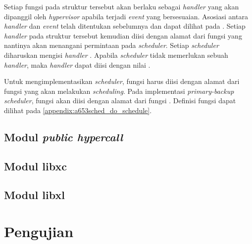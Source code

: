 Setiap fungsi pada struktur tersebut akan berlaku sebagai \textit{handler} yang akan dipanggil oleh \textit{hypervisor} apabila terjadi \textit{event} yang bersesuaian.
Asosiasi antara \textit{handler} dan \textit{event} telah ditentukan sebelumnya dan dapat dilihat pada .
Setiap \textit{handler} pada struktur tersebut kemudian diisi dengan alamat dari fungsi yang nantinya akan menangani permintaan pada \textit{scheduler}. Setiap \textit{scheduler} diharuskan mengisi \textit{handler} .
Apabila \textit{scheduler} tidak memerlukan sebuah \textit{handler}, maka \textit{handler} dapat diisi dengan nilai .

Untuk mengimplementasikan \textit{scheduler}, fungsi  harus diisi dengan alamat dari fungsi yang akan melakukan \textit{scheduling}.
Pada implementasi \textit{primary-backup scheduler}, fungsi  akan diisi dengan alamat dari fungsi .
Definisi fungsi  dapat dilihat pada \autoref{appendix:a653sched_do_schedule}.

\subsection{Modul \textit{public hypercall}}
\label{subsection:modul_public_hypercall}

\subsection{Modul libxc}
\label{subsection:modul_libxc}

\subsection{Modul libxl}
\label{subsection:modul_libxl}

\section{Pengujian}

